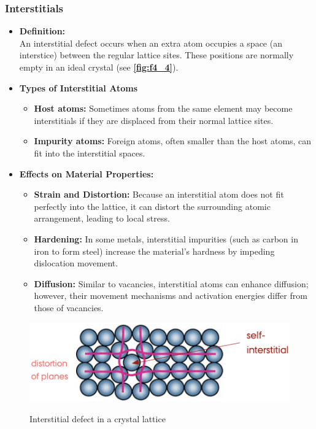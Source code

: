 \subsubsection{Interstitials} \label{sec:interstitial}
\begin{itemize}
  \item \textbf{Definition:} \\
    An interstitial defect occurs when an extra atom occupies a space (an interstice) between the regular lattice sites. These positions are normally empty in an ideal crystal (see \textbf{\autoref{fig:f4_4}}).
  \item \textbf{Types of Interstitial Atoms}
    \begin{itemize}
      \item \textbf{Host atoms:} Sometimes atoms from the same element may become interstitials if they are displaced from their normal lattice sites.
      \item \textbf{Impurity atoms:} Foreign atoms, often smaller than the host atoms, can fit into the interstitial spaces.
    \end{itemize}
  \item \textbf{Effects on Material Properties:}
    \begin{itemize}
      \item \textbf{Strain and Distortion:} Because an interstitial atom does not fit perfectly into the lattice, it can distort the surrounding atomic arrangement, leading to local stress.
      \item \textbf{Hardening:} In some metals, interstitial impurities (such as carbon in iron to form steel) increase the material’s hardness by impeding dislocation movement.
      \item \textbf{Diffusion:} Similar to vacancies, interstitial atoms can enhance diffusion; however, their movement mechanisms and activation energies differ from those of vacancies.
    \end{itemize}
\end{itemize}
\begin{figure} [ht]
  \centering
  \caption{Interstitial defect in a crystal lattice}
  \includegraphics[width=0.65\linewidth]{./figures/f4_4.png}
  \label{fig:f4_4}
\end{figure}



